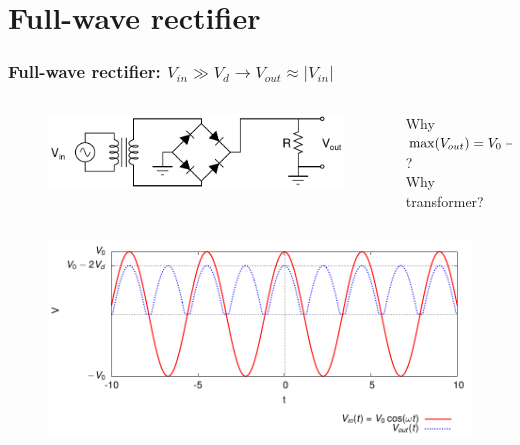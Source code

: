 \documentclass[beamer]{standalone}
\begin{document}
\section{Full-wave rectifier}
\begin{frame}
 \frametitle{Full-wave rectifier: $V_{in} \gg V_d \to V_{out} \approx | V_{in}|$}
  \begin{columns}[c]
    \begin{column}{.50\textwidth}
  \begin{figure}
    \includegraphics[width=0.90\columnwidth]{./schematics/full_wave_rectifier}
  \end{figure}
    \end{column}
    \begin{column}{.50\textwidth}
      Why $\max(V_{out}) = V_0 - \alert{2 V_d} $ ? \\
      Why transformer?
    \end{column}
  \end{columns}
    \begin{figure}
      \includegraphics[angle=0,width=1.00\columnwidth]{./plots/full_wave_rectifier}
    \end{figure}
\end{frame}
\end{document}
